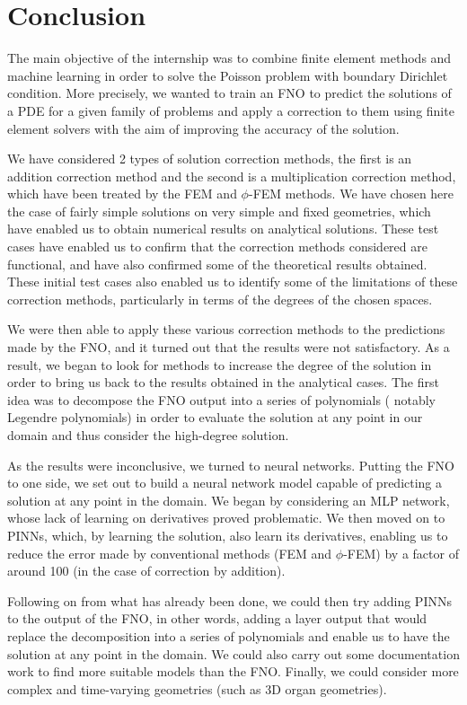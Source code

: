 \section{Conclusion}

The main objective of the internship was to combine finite element methods and machine learning in order to solve the Poisson problem with boundary Dirichlet condition. More precisely, we wanted to train an FNO to predict the solutions of a PDE for a given family of problems and apply a correction to them using finite element solvers with the aim of improving the accuracy of the solution. 

We have considered 2 types of solution correction methods, the first is an addition correction method and the second is a multiplication correction method, which have been treated by the FEM and $\phi$-FEM methods. We have chosen here the case of fairly simple solutions on very simple and fixed geometries, which have enabled us to obtain numerical results on analytical solutions. These test cases have enabled us to confirm that the correction methods considered are functional, and have also confirmed some of the theoretical results obtained. These initial test cases also enabled us to identify some of the limitations of these correction methods, particularly in terms of the degrees of the chosen spaces.  

 We were then able to apply these various correction methods to the predictions made by the FNO, and it turned out that the results were not satisfactory. As a result, we began to look for methods to increase the degree of the solution in order to bring us back to the results obtained in the analytical cases. The first idea was to decompose the FNO output into a series of polynomials ( notably Legendre polynomials) in order to evaluate the solution at any point in our domain and thus consider the high-degree solution.

As the results were inconclusive, we turned to neural networks. Putting the FNO to one side, we set out to build a neural network model capable of predicting a solution at any point in the domain. We began by considering an MLP network, whose lack of learning on derivatives proved problematic. We then moved on to PINNs, which, by learning the solution, also learn its derivatives, enabling us to reduce the error made by conventional methods (FEM and $\phi$-FEM) by a factor of around 100 (in the case of correction by addition). 

Following on from what has already been done, we could then try adding PINNs to the output of the FNO, in other words, adding a layer output that would replace the decomposition into a series of polynomials and enable us to have the solution at any point in the domain. We could also carry out some documentation work to find more suitable models than the FNO. Finally, we could consider more complex and time-varying geometries (such as 3D organ geometries).
